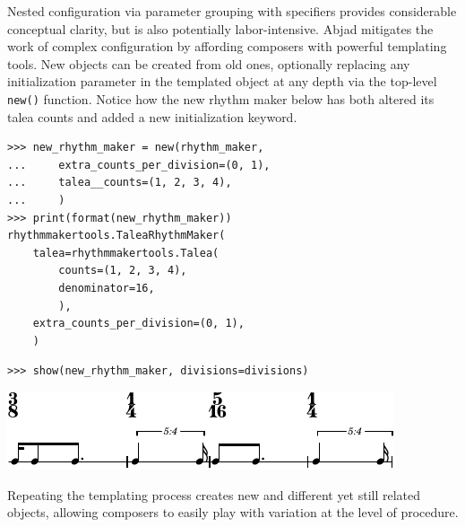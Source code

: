 \documentclass{article}
\begin{document}
Nested configuration via parameter grouping with specifiers provides
considerable conceptual clarity, but is also potentially labor-intensive. Abjad
mitigates the work of complex configuration by affording composers with
powerful templating tools. New objects can be created from old ones, optionally
replacing any initialization parameter in the templated object at any depth via
the top-level \texttt{new()} function. Notice how the new rhythm maker below
has both altered its talea counts and added a new initialization keyword.

\begin{lstlisting}
>>> new_rhythm_maker = new(rhythm_maker,
...     extra_counts_per_division=(0, 1),
...     talea__counts=(1, 2, 3, 4),
...     )
>>> print(format(new_rhythm_maker))
rhythmmakertools.TaleaRhythmMaker(
    talea=rhythmmakertools.Talea(
        counts=(1, 2, 3, 4),
        denominator=16,
        ),
    extra_counts_per_division=(0, 1),
    )
\end{lstlisting}

\begin{lstlisting}
>>> show(new_rhythm_maker, divisions=divisions)
\end{lstlisting}
\includegraphics{assets/lilypond-a769357ad75c64d981f789b0e3a0f4da.pdf}

Repeating the templating process creates new and different yet still related
objects, allowing composers to easily play with variation at the level of
procedure.

\end{document}
